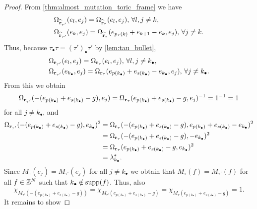 \begin{proof}
	From \cref{thm:almost_mutation_toric_frame} we have
	\begin{align*}
		 & \Omega_{\widehat{\mathbf{r}}_{\tau'}}(e_l, e_j) = \Omega_{\widehat{\mathbf{r}}_\tau}(e_l, e_j), \, \forall l, j \neq k,                        \\
		 & \Omega_{\widehat{\mathbf{r}}_{\tau'}}(e_k, e_j) = \Omega_{\widehat{\mathbf{r}}_\tau}(e_{p_\tau(k)} + e_{k+1} - e_k, e_j), \, \forall j \neq k.
	\end{align*}
	Thus, because $\tau_\bullet\tau = (\tau')_\bullet\tau'$ by \cref{lem:tau_bullet},
	\begin{align*}
		 & \Omega_{{\mathbf{r}}_{\tau'}}(e_l, e_j) = \Omega_{{\mathbf{r}}_\tau}(e_l, e_j), \, \forall l, j \neq {k_\bullet},                                                            \\
		 & \Omega_{{\mathbf{r}}_{\tau'}}(e_{k_\bullet}, e_j) = \Omega_{{\mathbf{r}}_\tau}(e_{p({k_\bullet})} + e_{s({k_\bullet})} - e_{k_\bullet}, e_j), \, \forall j \neq {k_\bullet}.
	\end{align*}
	From this we obtain
	\begin{equation*}
		\Omega_{\mathbf{r}_{\tau'}}(-(e_{p(k_\bullet)} + e_{s(k_\bullet)} - g), e_j) =
		\Omega_{\mathbf{r}_{\tau}}(e_{p(k_\bullet)} + e_{s(k_\bullet)} - g, e_j)^{-1}  = 1^{-1} = 1
	\end{equation*}
	for all $j \neq k_\bullet$, and
	\begin{align*}
		\Omega_{\mathbf{r}_{\tau'}}(-(e_{p(k_\bullet)} + e_{s(k_\bullet)} - g), e_{k_\bullet})^2
		 & =\Omega_{\mathbf{r}_{\tau}}(-(e_{p(k_\bullet)} + e_{s(k_\bullet)} - g), e_{p(k_\bullet)} + e_{s(k_\bullet)} - e_{k_\bullet})^2 \\
		 & =\Omega_{\mathbf{r}_{\tau}}(-(e_{p(k_\bullet)} + e_{s(k_\bullet)} - g),- e_{k_\bullet})^2                                      \\
		 & =\Omega_{\mathbf{r}_{\tau}}(e_{p(k_\bullet)} + e_{s(k_\bullet)} - g,e_{k_\bullet})^2                                           \\
		 & =\lambda_{k_\bullet}^* .
	\end{align*}
	Since $M_\tau (e_j) = M_{\tau'}(e_j)$ for all $j\neq k_\bullet$ we obtain that $M_\tau
		(f) = M_{\tau'}(f)$ for all $f\in \mathbb{Z}^N$ such that $k_\bullet \notin \operatorname{supp}(f)$. Thus,
	also
	\begin{equation*}
		\chi_{M_{\tau'}(-(e_{p(k_\bullet)} + e_{s(k_\bullet)} - g))} =
		\chi_{M_{\tau'}(e_{p(k_\bullet)} + e_{s(k_\bullet)} - g)} =
		\chi_{M_{\tau}(e_{p(k_\bullet)} + e_{s(k_\bullet)} - g)} = 1.
	\end{equation*}
	It remains to show

\end{proof}

